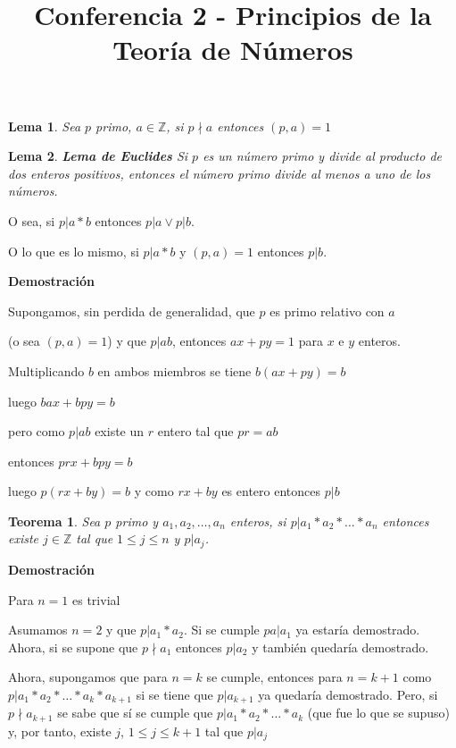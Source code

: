 \documentclass[a4paper,12pt]{report}
\title{Conferencia 2 - Principios de la Teoría de Números}
\author{}
\newtheorem*{teo}{Teorema}
\newtheorem*{lem}{Lema}
\begin{document}
\maketitle


\begin{lem}
 Sea $p$ primo, $a\in\mathbb{Z}$, si $p\nmid a$ entonces $(p,a)=1$
\end{lem}

\begin{lem}
 \textbf{Lema de Euclides} Si $p$ es un número primo y divide al producto de dos enteros positivos, entonces el número primo divide al menos a uno de los números. 
\end{lem}

O sea, si $p|a*b$ entonces $p|a\vee p|b$. 

O lo que es lo mismo, si $p|a*b$ y $(p,a)=1$ entonces $p|b$.

\textbf{Demostración}

Supongamos, sin perdida de generalidad, que $p$ es primo relativo con $a$

(o sea $(p,a)=1$) y que $p|ab$, entonces $ax+py=1$ para $x$ e $y$ enteros.

Multiplicando $b$ en ambos miembros se tiene $b(ax+py)=b$ 

luego $bax+bpy=b$

pero como $p|ab$ existe un $r$ entero tal que $pr=ab$

entonces $prx+bpy=b$

luego $p(rx+by)=b$ y como $rx+by$ es entero entonces $p|b$

\begin{teo}
 Sea $p$ primo y $a_1,a_2,\dots,a_n$ enteros, si $p|a_1*a_2*\dots*a_n$ entonces existe $j\in\mathbb{Z}$ tal que $1\leq j\leq n$  y $p|a_j$.
\end{teo}

\textbf{Demostración}

Para $n=1$ es trivial

Asumamos $n=2$ y que $p|a_1*a_2$.  Si se cumple $pa|a_1$ ya estaría demostrado. Ahora, si se supone que $p\nmid a_1$ entonces $p|a_2$ y también quedaría demostrado.

Ahora, supongamos que para $n=k$ se cumple, entonces para $n=k+1$ como $p|a_1*a_2*\dots *a_k*a_{k+1}$ si se tiene que $p|a_{k+1}$ ya quedaría demostrado. Pero, si $p\nmid a_{k+1}$ se sabe que sí se cumple que $p|a_1*a_2*\dots *a_k$ (que fue lo que se supuso) y, por tanto, existe $j$, $1\leq j \leq k+1$ tal que $p|a_j$
\end{document}
